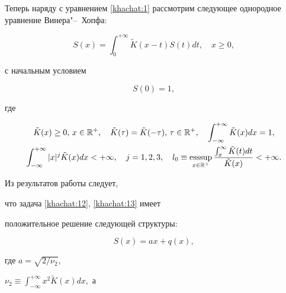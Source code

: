\smallskip





Теперь наряду с уравнением  \eqref{khachat:1} рассмотрим следующее однородное уравнение Винера"--~Хопфа:

\begin{equation}

S(x)=\int _{0}^{+\infty}\tilde{K}(x-t)S(t)dt,\quad

x\geq0,\label{khachat:12}

\end{equation}

с начальным условием

\begin{equation}

S(0)=1,\label{khachat:13}

\end{equation}

где

\begin{gather}

\tilde{K}(x)\geq0,\, x\in\mathbb{R}^+,\quad

\tilde{K}(\tau)=\tilde{K}(-\tau),\,\tau\in\mathbb{R}^+,\quad

\int _{-\infty}^{+\infty}\tilde{K}(x)dx=1,

\label{khachat:14} \\

\int _{-\infty}^{+\infty} |x|^j \tilde{K}(x)dx<+\infty,\quad

j=1,2,3,\quad l_0\equiv

\mathop{\rm esssup}\limits_{x\in\mathbb{R}^+}\frac{\int _{x}^{\infty}\tilde{K}(t)dt}{\tilde{K}(x)}<+\infty.\label{khachat:15}

\end{gather}

Из результатов работы \cite{popovkoval:bib:Arabadjyan} следует,

что задача \eqref{khachat:12}, \eqref{khachat:13} имеет

положительное решение следующей структуры:

 \begin{equation}

S(x)=ax+q(x),\label{khachat:17}

\end{equation}

где $a=\sqrt{{2}/{\nu_2}}$,

$\displaystyle \nu_2\equiv\int _{-\infty}^{+\infty}x^2\tilde{K}(x)dx,$ а

